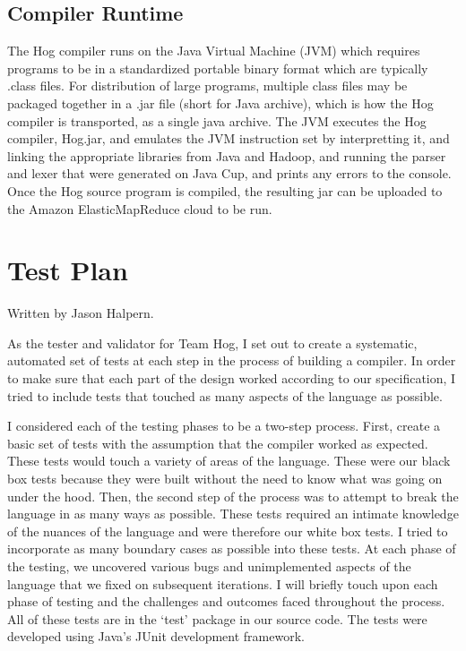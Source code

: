 \documentclass{report}
\begin{document}
\section{Compiler Runtime}

	The Hog compiler runs on the Java Virtual Machine (JVM) which requires programs to be in a standardized portable binary format which are typically .class files. For distribution of large programs,
multiple class files may be packaged together in a .jar file (short for Java archive), which is how the Hog
compiler is transported, as a single java archive.  The JVM executes the Hog compiler, Hog.jar, and emulates
the JVM instruction set by interpretting it, and linking the appropriate libraries from Java and Hadoop, and running the parser and lexer that were generated on Java Cup, and prints any errors to the console. Once the 
Hog source program is compiled, the resulting jar can be uploaded to the Amazon ElasticMapReduce cloud to be run. 


\chapter{Test Plan}
\label{chap:test}

Written by Jason Halpern.

As the tester and validator for Team Hog, I set out to create a systematic, automated set of tests at each step in the process of building a compiler. In order to make sure that each part of the design worked according to our specification, I tried to include tests that touched as many aspects of the language as possible. 

I considered each of the testing phases to be a two-step process. First, create a basic set of tests with the assumption that the compiler worked as expected. These tests would touch a variety of areas of the language. These were our black box tests because they were built without the need to know what was going on under the hood. Then, the second step of the process was to attempt to break the language in as many ways as possible. These tests required an intimate knowledge of the nuances of the language and were therefore our white box tests. I tried to incorporate as many boundary cases as possible into these tests. At each phase of the testing, we uncovered various bugs and unimplemented aspects of the language that we fixed on subsequent iterations. I will briefly touch upon each phase of testing and the challenges and outcomes faced throughout the process. All of these tests are in the ‘test’ package in our source code. The tests were developed using Java’s JUnit development framework.
\end{document}
